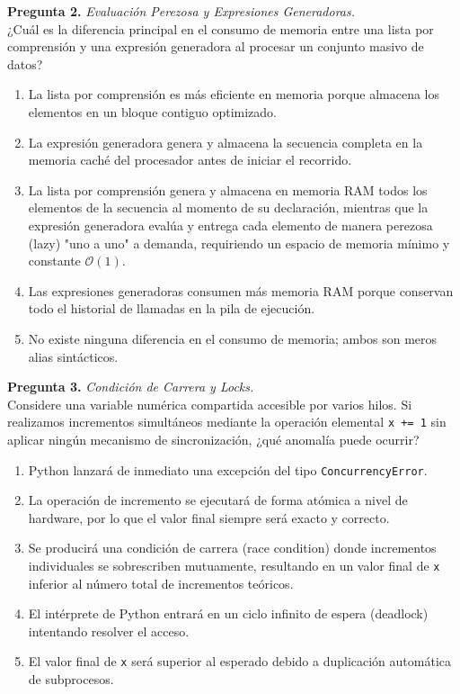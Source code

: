 \documentclass[12pt,letterpaper]{article}
\begin{document}
\textbf{Pregunta 2.} \textit{Evaluación Perezosa y Expresiones Generadoras.} \\
¿Cuál es la diferencia principal en el consumo de memoria entre una lista por comprensión y una expresión generadora al procesar un conjunto masivo de datos?
\begin{enumerate}[label=\alph*)]
  \item La lista por comprensión es más eficiente en memoria porque almacena los elementos en un bloque contiguo optimizado.
  \item La expresión generadora genera y almacena la secuencia completa en la memoria caché del procesador antes de iniciar el recorrido.
  \item La lista por comprensión genera y almacena en memoria RAM todos los elementos de la secuencia al momento de su declaración, mientras que la expresión generadora evalúa y entrega cada elemento de manera perezosa (lazy) "uno a uno" a demanda, requiriendo un espacio de memoria mínimo y constante $\mathcal{O}(1)$.
  \item Las expresiones generadoras consumen más memoria RAM porque conservan todo el historial de llamadas en la pila de ejecución.
  \item No existe ninguna diferencia en el consumo de memoria; ambos son meros alias sintácticos.
\end{enumerate}

\bigskip

\textbf{Pregunta 3.} \textit{Condición de Carrera y Locks.} \\
Considere una variable numérica compartida accesible por varios hilos. Si realizamos incrementos simultáneos mediante la operación elemental \texttt{x += 1} sin aplicar ningún mecanismo de sincronización, ¿qué anomalía puede ocurrir?
\begin{enumerate}[label=\alph*)]
  \item Python lanzará de inmediato una excepción del tipo \texttt{ConcurrencyError}.
  \item La operación de incremento se ejecutará de forma atómica a nivel de hardware, por lo que el valor final siempre será exacto y correcto.
  \item Se producirá una condición de carrera (race condition) donde incrementos individuales se sobrescriben mutuamente, resultando en un valor final de \texttt{x} inferior al número total de incrementos teóricos.
  \item El intérprete de Python entrará en un ciclo infinito de espera (deadlock) intentando resolver el acceso.
  \item El valor final de \texttt{x} será superior al esperado debido a duplicación automática de subprocesos.
\end{enumerate}
\end{document}
